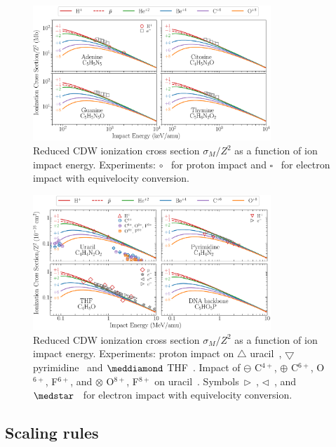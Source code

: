 \documentclass[10pt,showpacs,showkeys,twocolumn]{revtex4}
\begin{document}
\begin{figure}[t!]
\centering
\includegraphics[width=0.8\textwidth]{figuras/adn1.eps}
\caption{Reduced CDW ionization cross section $\sigma_{M}/Z^2$ as a function 
of ion impact energy. Experiments: \mbox{\Large$\circ$}~\cite{iriki2011} 
for proton impact and $\square$~\cite{rahman2016} for electron impact 
with equivelocity conversion.}
\label{fig:crossDNA_1}
\end{figure} 

\begin{figure}[t!]
\centering
\includegraphics[width=0.8\textwidth]{figuras/adn2.eps}
\caption{Reduced CDW ionization cross section $\sigma_{M}/Z^2$ as a function 
of ion impact energy. Experiments: proton impact on 
$\triangle$ uracil~\cite{itoh2013}, 
$\bigtriangledown$ pyrimidine~\cite{wolff2014} and $\meddiamond$
THF~\cite{wang2016}. Impact of $\ominus$ C$^{4+}$, 
$\oplus$ C$^{6+}$, O$^{6+}$, F$^{6+}$, and
$\otimes$ O$^{8+}$, F$^{8+}$ on 
uracil~\cite{agnihotri2012,agnihotri2013}. 
Symbols~$\rhd$~\cite{bug2017}, $\lhd$~\cite{wolf2019}, and 
$\medstar$~\cite{fuss2009} for electron impact with equivelocity 
conversion.}
\label{fig:crossDNA_2}
\end{figure} 

\subsection{Scaling rules}
\label{subsec:scaling}
\end{document}
